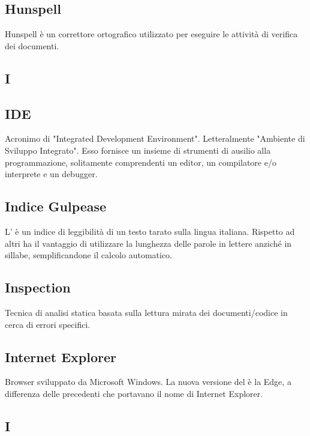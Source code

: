 \subsection{Hunspell}
Hunspell è un correttore ortografico utilizzato per eseguire le attività di verifica dei documenti.

\newpage

\begin{center}
\Huge\section{\uppercase{I}}
\end{center}

\subsection{IDE}
Acronimo di "Integrated Development Environment". Letteralmente "Ambiente
di Sviluppo Integrato". Esso fornisce un insieme di strumenti di ausilio
alla programmazione, solitamente comprendenti un editor, un compilatore e/o
interprete e un debugger.

\subsection{Indice Gulpease}
L' è un indice di leggibilità di un testo tarato sulla lingua
italiana. Rispetto ad altri ha il vantaggio di utilizzare la lunghezza delle parole in lettere
anziché in sillabe, semplificandone il calcolo automatico.

\subsection{Inspection }
Tecnica di analisi statica basata sulla lettura mirata dei documenti/codice in cerca di
errori specifici.

\subsection{Internet Explorer}
Browser  sviluppato da Microsoft Windows. La nuova versione del  è la Edge, a differenza delle precedenti che portavano il nome di Internet Explorer.

\newpage

\begin{center}
\Huge\section{\uppercase{i}}
\end{center}

